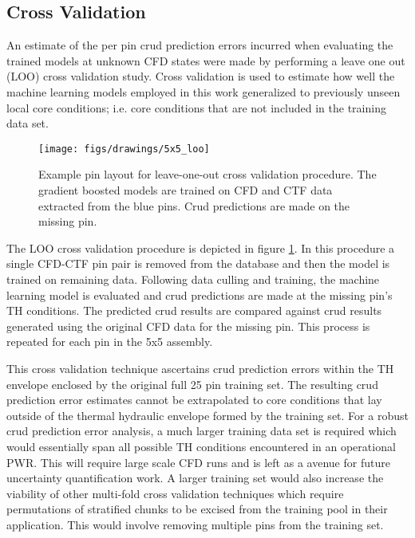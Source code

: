 \subsection{Cross Validation}

An estimate of the per pin crud prediction errors incurred when evaluating the trained models at unknown CFD states were made by performing a leave one out (LOO) cross validation study.  Cross validation is used to estimate how well the machine learning models employed in this work generalized to previously unseen local core conditions; i.e. core conditions that are not included in the training data set.

\begin{figure}[h]
    \centering
    \texttt{[image: figs/drawings/5x5\_loo]}
    \caption[Example pin layout for leave-one-out cross validation procedure.]{Example pin layout for leave-one-out cross validation procedure.  The gradient boosted models are trained on CFD and CTF data extracted from the blue pins.  Crud predictions are made on the missing pin.}
    \label{fig:5x5loo}
\end{figure}

The LOO cross validation procedure is depicted in figure \ref{fig:5x5loo}.  In this procedure a single CFD-CTF pin pair is removed from the database and then the model is trained on remaining data.  Following data culling and training, the machine learning model is evaluated and crud predictions are made at the missing pin's TH conditions.
The predicted crud results are compared against crud results generated using the original CFD data for the missing pin.  This process is repeated for each pin in the 5x5 assembly.

This cross validation technique ascertains crud prediction errors within the TH envelope enclosed by the original full 25 pin training set.  The resulting crud prediction error estimates cannot be extrapolated to core conditions that lay outside of the thermal hydraulic envelope formed by the training set.  For a robust crud prediction error analysis, a much larger training data set is required which would essentially span all possible TH conditions encountered in an operational PWR.  This will require large scale CFD runs and is left as a avenue for future uncertainty quantification work.  A larger training set would also increase the viability of other multi-fold cross validation techniques which require permutations of stratified chunks to be excised from the training pool in their application.  This would involve removing multiple pins from the training set.

